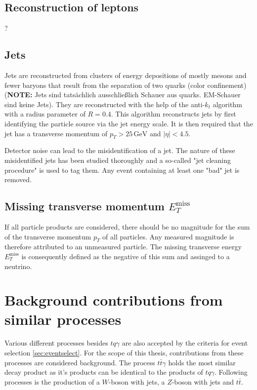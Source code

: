 \subsection{Reconstruction of leptons}
\label{sec:reconlepton}
?
\subsection{Jets}
\label{sec:jets}
Jets are reconstructed from clusters of energy depositions of mostly mesons and fewer baryons that result from the separation of two quarks (color confinement) (\textbf{NOTE: }Jets sind tatsächlich ausschließlich Schauer aus quarks. EM-Schauer sind keine Jets). They are reconstructed with the help of the anti-$k_t$ algorithm \cite{anti_k_t} with a radius parameter of $R = 0.4$. 
This algorithm reconstructs jets by first identifying the particle source via the jet energy scale. It is then required that the jet has a transverse momentum of $p_T > 25 \,\si{\giga\electronvolt}$ and $\bigl|\eta\bigr| < 4.5$. 

Detector noise can lead to the misidentification of a jet. The nature of these misidentified jets has been studied thoroughly \cite{70} and a so-called "jet cleaning procedure" is used to tag them. 
Any event containing at least one "bad" jet is removed. 

\subsection{Missing transverse momentum \texorpdfstring{$E_T^{\text{miss}}$}{}}

If all particle products are considered, there should be no magnitude for the sum of the transverse momentum $p_T$ of all particles. 
Any measured magnitude is therefore attributed to an unmeasured particle. The missing transverse energy $E_T^{\text{miss}}$ is consequently defined as the negative of this sum and assinged to a neutrino. 

\section{Background contributions from similar processes}



Various different processes besides $tq\gamma$ are also accepted by the criteria for event selection \ref{sec:eventselect}. For the scope of this thesis, contributions from these processes are considered background.  
The process $t\bar{t}\gamma$ holds the most similar decay product as it's products can be identical to the products of $tq\gamma$. %
Following processes is the production of a $W$-boson with jets, a $Z$-boson with jets and $t\bar{t}$.

